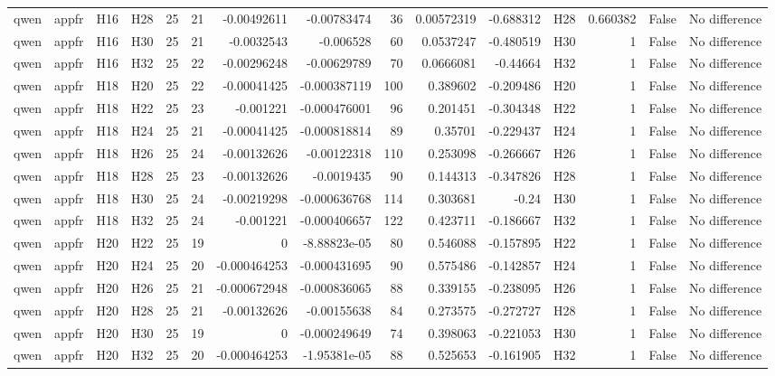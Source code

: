 \begin{longtable}{llllrrrrrrrlrrl}
qwen & appfr & H16 & H28 & 25 & 21 & -0.00492611 & -0.00783474 & 36 & 0.00572319 & -0.688312 & H28 & 0.660382 & False & No difference \\
qwen & appfr & H16 & H30 & 25 & 21 & -0.0032543 & -0.006528 & 60 & 0.0537247 & -0.480519 & H30 & 1 & False & No difference \\
qwen & appfr & H16 & H32 & 25 & 22 & -0.00296248 & -0.00629789 & 70 & 0.0666081 & -0.44664 & H32 & 1 & False & No difference \\
qwen & appfr & H18 & H20 & 25 & 22 & -0.00041425 & -0.000387119 & 100 & 0.389602 & -0.209486 & H20 & 1 & False & No difference \\
qwen & appfr & H18 & H22 & 25 & 23 & -0.001221 & -0.000476001 & 96 & 0.201451 & -0.304348 & H22 & 1 & False & No difference \\
qwen & appfr & H18 & H24 & 25 & 21 & -0.00041425 & -0.000818814 & 89 & 0.35701 & -0.229437 & H24 & 1 & False & No difference \\
qwen & appfr & H18 & H26 & 25 & 24 & -0.00132626 & -0.00122318 & 110 & 0.253098 & -0.266667 & H26 & 1 & False & No difference \\
qwen & appfr & H18 & H28 & 25 & 23 & -0.00132626 & -0.0019435 & 90 & 0.144313 & -0.347826 & H28 & 1 & False & No difference \\
qwen & appfr & H18 & H30 & 25 & 24 & -0.00219298 & -0.000636768 & 114 & 0.303681 & -0.24 & H30 & 1 & False & No difference \\
qwen & appfr & H18 & H32 & 25 & 24 & -0.001221 & -0.000406657 & 122 & 0.423711 & -0.186667 & H32 & 1 & False & No difference \\
qwen & appfr & H20 & H22 & 25 & 19 & 0 & -8.88823e-05 & 80 & 0.546088 & -0.157895 & H22 & 1 & False & No difference \\
qwen & appfr & H20 & H24 & 25 & 20 & -0.000464253 & -0.000431695 & 90 & 0.575486 & -0.142857 & H24 & 1 & False & No difference \\
qwen & appfr & H20 & H26 & 25 & 21 & -0.000672948 & -0.000836065 & 88 & 0.339155 & -0.238095 & H26 & 1 & False & No difference \\
qwen & appfr & H20 & H28 & 25 & 21 & -0.00132626 & -0.00155638 & 84 & 0.273575 & -0.272727 & H28 & 1 & False & No difference \\
qwen & appfr & H20 & H30 & 25 & 19 & 0 & -0.000249649 & 74 & 0.398063 & -0.221053 & H30 & 1 & False & No difference \\
qwen & appfr & H20 & H32 & 25 & 20 & -0.000464253 & -1.95381e-05 & 88 & 0.525653 & -0.161905 & H32 & 1 & False & No difference \\

\end{longtable}
